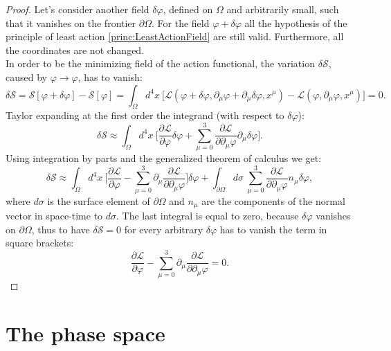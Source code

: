 \begin{proof}
    Let's consider another field $\delta \varphi$, defined on $\Omega$ and arbitrarily small, such that it vanishes on the frontier $\partial\Omega$. For the field $\varphi+\delta\varphi$ all the hypothesis of the principle of least action \ref{princ:LeastActionField} are still valid. Furthermore, all the coordinates are not changed.\\ In order to be the minimizing field  of the action functional, the variation $\delta\mathcal{S}$, caused by $\varphi\rightarrow\varphi$, has to vanish:
    \begin{equation*}
        \delta\mathcal{S} =\mathcal{S}[\varphi+\delta\varphi] -\mathcal{S}[\varphi] =\int_{\Omega}d^4x\ \bigg[\mathcal{L}(\varphi+\delta\varphi,\partial_\mu\varphi+\partial_\mu\delta\varphi,x^\mu) -\mathcal{L}(\varphi,\partial_\mu\varphi,x^\mu) \bigg]=0.
    \end{equation*}
    Taylor expanding at the first order the integrand (with respect to $\delta\varphi$):
    \begin{equation*}
        \delta\mathcal{S}\approx \int_{\Omega}d^4x\ \bigg[\frac{\partial\mathcal{L} }{\partial\varphi}\delta\varphi+\sum_{\mu=0}^3\frac{\partial\mathcal{L} }{\partial\partial_\mu\varphi}\partial_\mu\delta\varphi\bigg].
    \end{equation*}
    Using integration by parts and the generalized theorem of calculus we get:
    \begin{equation*}
        \delta\mathcal{S}\approx \int_{\Omega}d^4x\ \bigg[\frac{\partial\mathcal{L} }{\partial\varphi}-\sum_{\mu=0}^3\partial_\mu\frac{\partial\mathcal{L} }{\partial\partial_\mu\varphi}\bigg]\delta\varphi+\int_{\partial\Omega}d\sigma\ \sum_{\mu=0}^3\frac{\partial\mathcal{L} }{\partial\partial_\mu\varphi}n_\mu\delta\varphi,
    \end{equation*}
    where $d\sigma$ is the surface element of $\partial\Omega$ and $n_\mu$ are the components of the normal vector in space-time to $d\sigma$. The last integral is equal to zero, because $\delta\varphi$ vanishes on $\partial\Omega$, thus to have $\delta\mathcal{S} =0$ for every arbitrary $\delta\varphi$ has to vanish the term in square brackets:
    \begin{equation*}
        \frac{\partial\mathcal{L} }{\partial\varphi}-\sum_{\mu=0}^3\partial_\mu\frac{\partial\mathcal{L} }{\partial\partial_\mu\varphi}=0.
    \end{equation*} 
\end{proof}
\section{The phase space}